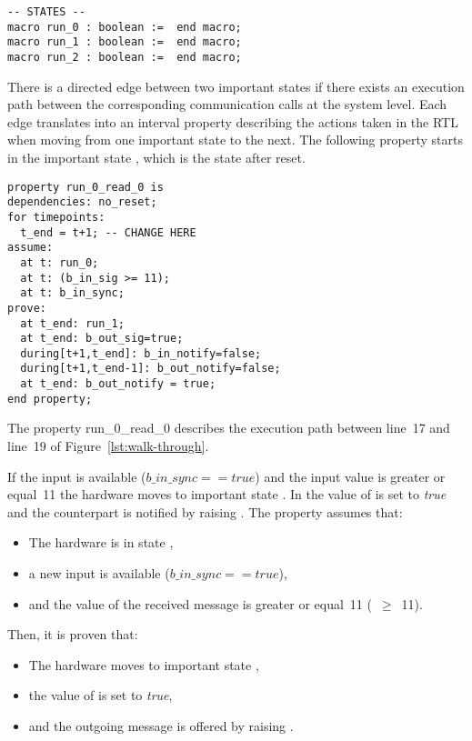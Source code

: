 {\begin{small}
\begin{verbatim}
-- STATES -- 
macro run_0 : boolean :=  end macro;
macro run_1 : boolean :=  end macro;
macro run_2 : boolean :=  end macro;
\end{verbatim}
\end{small}

There is a directed edge between two important states if there exists an
execution path between the corresponding communication calls at the system level. %
Each edge translates into an interval property describing the actions taken in the RTL when moving from one important state to the next. %
The following property starts in the important state ,
which is the state after reset. %

\begin{small}
\begin{verbatim}
property run_0_read_0 is
dependencies: no_reset;
for timepoints:
  t_end = t+1; -- CHANGE HERE
assume: 
  at t: run_0;
  at t: (b_in_sig >= 11);
  at t: b_in_sync;
prove:
  at t_end: run_1;
  at t_end: b_out_sig=true;
  during[t+1,t_end]: b_in_notify=false;
  during[t+1,t_end-1]: b_out_notify=false;
  at t_end: b_out_notify = true;
end property;
\end{verbatim}
\end{small}

The property run\_0\_read\_0 describes the execution path between
line~17 and line~19 of Figure~\ref{lst:walk-through}. %

If the input is available ($b\_in\_sync == true$) and the input value
is greater or equal~11 the hardware moves to important state
. %
In  the value of  is set to
\textit{true} and the counterpart is notified by raising
. The property assumes that:
\begin{itemize}
\item The hardware is in state ,
\item a new input is available ($b\_in\_sync == true$),
\item and the value of the received message is greater or equal~11 (~$\geq$~11). 
\end{itemize} 
Then, it is proven that: 
\begin{itemize}
\item The hardware moves to important state ,
\item the value of  is set to \textit{true},
\item and the outgoing message is offered by raising
  . %
\end{itemize}

}
